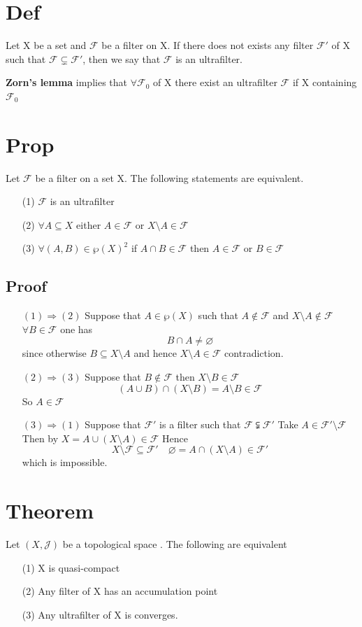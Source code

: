 \documentclass{book}
\begin{document}
\section{Def}
Let X be a set and $\mathcal{F}$ be a filter on X. If there does not exists any filter $\mathcal{F}'$ of X such that $\mathcal{F}\subsetneq\mathcal{F}'$, then we say that $\mathcal{F}$ is an ultrafilter.

\textbf{Zorn's lemma} implies that $\forall \mathcal{F_0}$ of X there exist an ultrafilter $\mathcal{F}$ if X containing $\mathcal{F}_0$
\section{Prop}
Let $\mathcal{F}$ be a filter on a set X. The following statements are equivalent.
\begin{itemize}
    \item[(1)] $\mathcal{F}$ is an ultrafilter 
    \item[(2)] $\forall A\subseteq X$ either $A\in \mathcal{F}$ or $X\setminus A\in \mathcal{F}$
    \item[(3)] $\forall (A,B)\in \wp(X)^2$ if $A\cap B\in \mathcal{F}$ then $A\in \mathcal{F}$ or $B\in \mathcal{F}$
\end{itemize}
\subsection*{Proof}
\begin{itemize}
    \item [$(1)\Rightarrow(2)$]Suppose that $A\in \wp(X)$ such that $A\not\in \mathcal{F}$ and $X\setminus A\not\in \mathcal{F}$ $\forall B\in \mathcal{F}$ one has $$B\cap A\neq \varnothing$$ since otherwise $B\subseteq X\setminus A$ and hence $X\setminus A\in \mathcal{F}$ contradiction.
    \item [$(2)\Rightarrow(3)$]Suppose that $B\not\in \mathcal{F}$ then $X\setminus B\in \mathcal{F}$
    $$(A\cup B)\cap(X\setminus B)=A\setminus B\in \mathcal{F}$$
    So $A\in \mathcal{F}$
    \item[$(3)\Rightarrow(1)$]
    Suppose that $\mathcal{F}'$ is a filter such that $\mathcal{F}\subsetneqq\mathcal{F}'$ Take $A\in \mathcal{F}'\setminus\mathcal{F}$ Then by $X=A\cup(X\setminus A)\in \mathcal{F}$ Hence $$X\setminus \mathcal{F}\subseteq\mathcal{F}'\quad \varnothing=A\cap(X\setminus A)\in \mathcal{F}'$$ which is impossible.
\end{itemize}
\section{Theorem}
Let $(X,\mathcal{J})$ be a topological space . The following are equivalent
\begin{itemize}
    \item [(1)] X is quasi-compact
    \item[(2)] Any filter of X has an accumulation point
    \item[(3)] Any ultrafilter of X is converges. 
\end{itemize}
\end{document}
